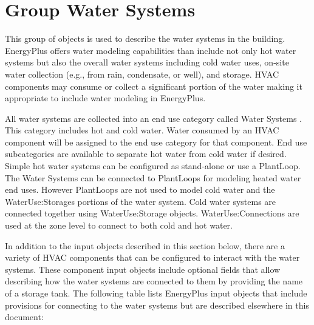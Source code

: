 \section{Group Water Systems}\label{group-water-systems}

This group of objects is used to describe the water systems in the building. EnergyPlus offers water modeling capabilities than include not only hot water systems but also the overall water systems including cold water uses, on-site water collection (e.g., from rain, condensate, or well), and storage. HVAC components may consume or collect a significant portion of the water making it appropriate to include water modeling in EnergyPlus.

All water systems are collected into an end use category called Water Systems . This category includes hot and cold water. Water consumed by an HVAC component will be assigned to the end use category for that component. End use subcategories are available to separate hot water from cold water if desired. Simple hot water systems can be configured as stand-alone or use a PlantLoop. The Water Systems can be connected to PlantLoops for modeling heated water end uses. However PlantLoops are not used to model cold water and the WaterUse:Storages portions of the water system. Cold water systems are connected together using WaterUse:Storage objects. WaterUse:Connections are used at the zone level to connect to both cold and hot water.

In addition to the input objects described in this section below, there are a variety of HVAC components that can be configured to interact with the water systems. These component input objects include optional fields that allow describing how the water systems are connected to them by providing the name of a storage tank. The following table lists EnergyPlus input objects that include provisions for connecting to the water systems but are described elsewhere in this document:

